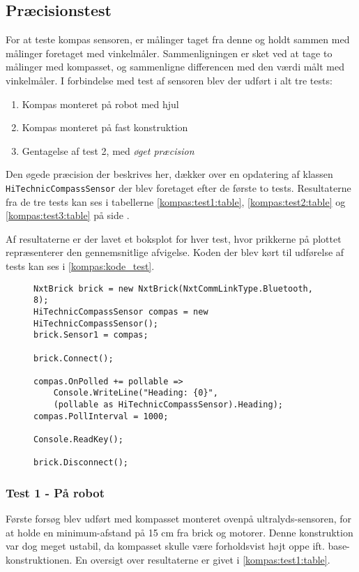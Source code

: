 \subsection{Præcisionstest}\label{kompas:precision}
For at teste kompas sensoren, er målinger taget fra denne og holdt sammen med målinger foretaget med vinkelmåler.
Sammenligningen er sket ved at tage to målinger med kompasset, og sammenligne differencen med den værdi målt med vinkelmåler.
I forbindelse med test af sensoren blev der udført i alt tre tests:
\begin{enumerate}
\item Kompas monteret på robot med hjul
\item Kompas monteret på fast konstruktion
\item Gentagelse af test 2, med \textit{øget præcision}
\end{enumerate}
Den øgede præcision der beskrives her, dækker over en opdatering af \mindsqualls klassen \lstinline[style=csharp]!HiTechnicCompassSensor! der blev foretaget efter de første to tests.
Resultaterne fra de tre tests kan ses i tabellerne \ref{kompas:test1:table}, \ref{kompas:test2:table} og \ref{kompas:test3:table} på side \pageref{kompas:test1:table}.

Af resultaterne er der lavet et boksplot for hver test, hvor prikkerne på plottet repræsenterer den gennemsnitlige afvigelse.
Koden der blev kørt til udførelse af tests kan ses i \cref{kompas:kode_test}.

\begin{figure}[h]
\begin{lstlisting}[style=csharpsmall,caption={Kode brugt til test},label=kompas:kode_test,frame=single]
NxtBrick brick = new NxtBrick(NxtCommLinkType.Bluetooth, 8);
HiTechnicCompassSensor compas = new HiTechnicCompassSensor();
brick.Sensor1 = compas;

brick.Connect();

compas.OnPolled += pollable =>
	Console.WriteLine("Heading: {0}",
	(pollable as HiTechnicCompassSensor).Heading);
compas.PollInterval = 1000;

Console.ReadKey();

brick.Disconnect();
\end{lstlisting}
\end{figure}

\subsubsection{Test 1 - På robot}
Første forsøg blev udført med kompasset monteret ovenpå ultralyds-sensoren, for at holde en minimum-afstand på 15 cm fra brick og motorer.
Denne konstruktion var dog meget ustabil, da kompasset skulle være forholdsvist højt oppe ift. base-konstruktionen.
En oversigt over resultaterne er givet i \cref{kompas:test1:table}.

